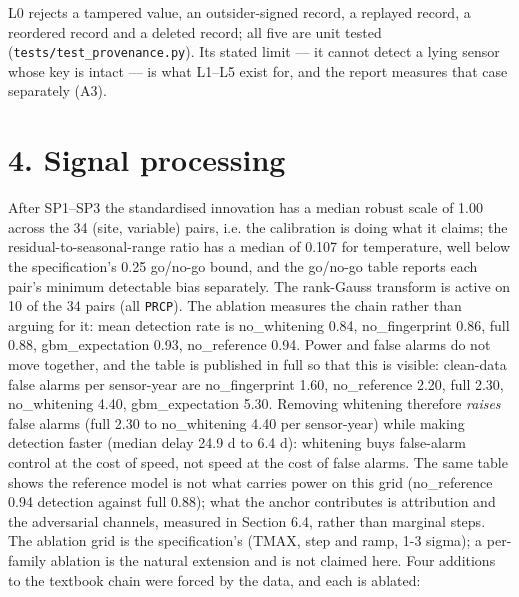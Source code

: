 \documentclass[10pt,a4paper]{article}
\begin{document}
L0 rejects a tampered value, an outsider-\allowbreak{}signed record, a replayed record, a reordered record and a deleted record; all five are unit tested (\texttt{tests/\allowbreak{}test\_\allowbreak{}provenance.py}). Its stated limit — it cannot detect a lying sensor whose key is intact — is what L1–L5 exist for, and the report measures that case separately (A3).

\section*{4. Signal processing}
After SP1–SP3 the standardised innovation has a median robust scale of 1.00 across the 34 (site, variable) pairs, i.e. the calibration is doing what it claims; the residual-\allowbreak{}to-\allowbreak{}seasonal-\allowbreak{}range ratio has a median of 0.107 for temperature, well below the specification's 0.25 go/\allowbreak{}no-\allowbreak{}go bound, and the go/\allowbreak{}no-\allowbreak{}go table reports each pair's minimum detectable bias separately. The rank-\allowbreak{}Gauss transform is active on 10 of the 34 pairs (all \texttt{PRCP}). The ablation measures the chain rather than arguing for it: mean detection rate is no\_\allowbreak{}whitening 0.84, no\_\allowbreak{}fingerprint 0.86, full 0.88, gbm\_\allowbreak{}expectation 0.93, no\_\allowbreak{}reference 0.94. Power and false alarms do not move together, and the table is published in full so that this is visible: clean-\allowbreak{}data false alarms per sensor-\allowbreak{}year are no\_\allowbreak{}fingerprint 1.60, no\_\allowbreak{}reference 2.20, full 2.30, no\_\allowbreak{}whitening 4.40, gbm\_\allowbreak{}expectation 5.30. Removing whitening therefore \emph{raises} false alarms (full 2.30 to no\_\allowbreak{}whitening 4.40 per sensor-\allowbreak{}year) while making detection faster (median delay 24.9 d to 6.4 d): whitening buys false-\allowbreak{}alarm control at the cost of speed, not speed at the cost of false alarms. The same table shows the reference model is not what carries power on this grid (no\_\allowbreak{}reference 0.94 detection against full 0.88); what the anchor contributes is attribution and the adversarial channels, measured in Section 6.4, rather than marginal steps. The ablation grid is the specification's (TMAX, step and ramp, 1-\allowbreak{}3 sigma); a per-\allowbreak{}family ablation is the natural extension and is not claimed here. Four additions to the textbook chain were forced by the data, and each is ablated:
\end{document}
